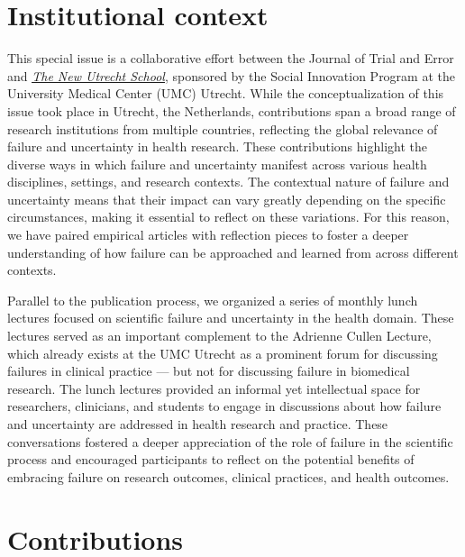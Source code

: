 \documentclass[authordate, empirical]{jote-new-article}
\begin{document}
	\section{Institutional context}



	This special issue is a collaborative effort between the Journal of Trial and Error and \emph{\underline{\href{https://www.uu.nl/en/research/the-new-utrecht-school}{The New Utrecht School}}}, sponsored by the Social Innovation Program at the University Medical Center (UMC) Utrecht. While the conceptualization of this issue took place in Utrecht, the Netherlands, contributions span a broad range of research institutions from multiple countries, reflecting the global relevance of failure and uncertainty in health research. These contributions highlight the diverse ways in which failure and uncertainty manifest across various health disciplines, settings, and research contexts. The contextual nature of failure and uncertainty means that their impact can vary greatly depending on the specific circumstances, making it essential to reflect on these variations. For this reason, we have paired empirical articles with reflection pieces to foster a deeper understanding of how failure can be approached and learned from across different contexts.



	Parallel to the publication process, we organized a series of monthly lunch lectures focused on scientific failure and uncertainty in the health domain. These lectures served as an important complement to the Adrienne Cullen Lecture, which already exists at the UMC Utrecht as a prominent forum for discussing failures in clinical practice — but not for discussing failure in biomedical research. The lunch lectures provided an informal yet intellectual space for researchers, clinicians, and students to engage in discussions about how failure and uncertainty are addressed in health research and practice. These conversations fostered a deeper appreciation of the role of failure in the scientific process and encouraged participants to reflect on the potential benefits of embracing failure on research outcomes, clinical practices, and health outcomes.







	\section{Contributions }
\end{document}

